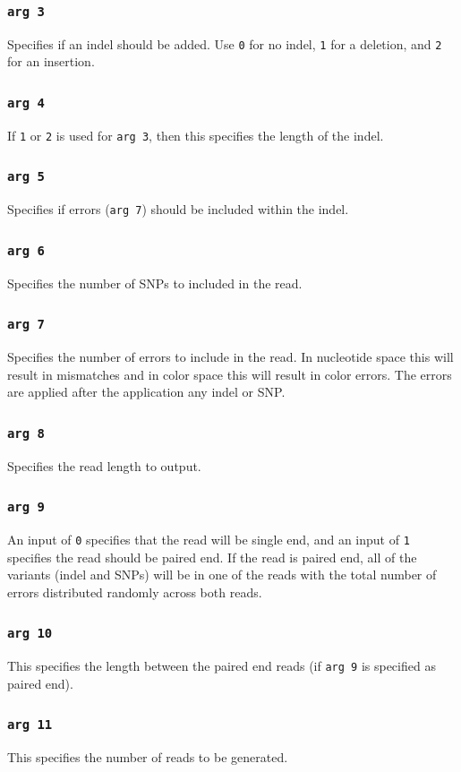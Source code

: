 \documentclass[a4paper,12pt]{book}
\newcommand{\TT}[1]{{\tt #1}} %
\begin{document}
\subsubsection{\TT{arg 3}}
Specifies if an indel should be added.
Use \TT{0} for no indel, \TT{1} for a deletion, and \TT{2} for an insertion.
\subsubsection{\TT{arg 4}}
If \TT{1} or \TT{2} is used for \TT{arg 3}, then this specifies the length of the indel.
\subsubsection{\TT{arg 5}}
Specifies if errors (\TT{arg 7}) should be included within the indel. 
\subsubsection{\TT{arg 6}}
Specifies the number of SNPs to included in the read.
\subsubsection{\TT{arg 7}}
Specifies the number of errors to include in the read.
In nucleotide space this will result in mismatches and in color space this will result in color errors.
The errors are applied after the application any indel or SNP.
\subsubsection{\TT{arg 8}}
Specifies the read length to output.
\subsubsection{\TT{arg 9}}
An input of \TT{0} specifies that the read will be single end, and an input of \TT{1} specifies the read should be paired end.
If the read is paired end, all of the variants (indel and SNPs) will be in one of the reads with the total number of errors distributed randomly across both reads.
\subsubsection{\TT{arg 10}}
This specifies the length between the paired end reads (if \TT{arg 9} is specified as paired end).
\subsubsection{\TT{arg 11}}
This specifies the number of reads to be generated.
\end{document}
